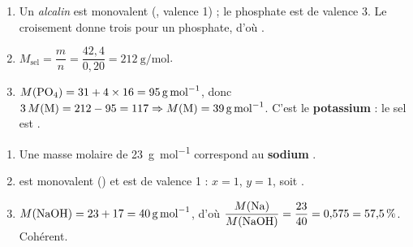 \documentclass[11pt,a4paper]{article}
\begin{document}
\begin{corrige}
\begin{enumerate}[label=\alph*)]
  \item Un \emph{alcalin} est monovalent (, valence 1) ; le phosphate  est de valence 3.
        Le croisement donne trois  pour un phosphate, d'où .
  \item $M_{\text{sel}}=\dfrac{m}{n}=\dfrac{42{,}4}{0{,}20}=\qty{212}{\gram\per\mol}$.
  \item $M(\ce{PO4})=31+4\times16=\qty{95}{\gram\per\mol}$, donc
        $3\,M(\ce{M})=212-95=117 \Rightarrow M(\ce{M})=\qty{39}{\gram\per\mol}$.
        C'est le \textbf{potassium}  : le sel est .
\end{enumerate}
\end{corrige}

\begin{corrige}
\begin{enumerate}[label=\alph*)]
  \item Une masse molaire de \qty{23}{\gram\per\mol} correspond au \textbf{sodium} .
  \item {} est monovalent () et  est de valence 1 : $x=1$, $y=1$, soit .
  \item $M(\ce{NaOH})=23+17=\qty{40}{\gram\per\mol}$, d'où
        $\dfrac{M(\ce{Na})}{M(\ce{NaOH})}=\dfrac{23}{40}=0{,}575=57{,}5\,\%$. Cohérent.
\end{enumerate}
\end{corrige}
\end{document}
